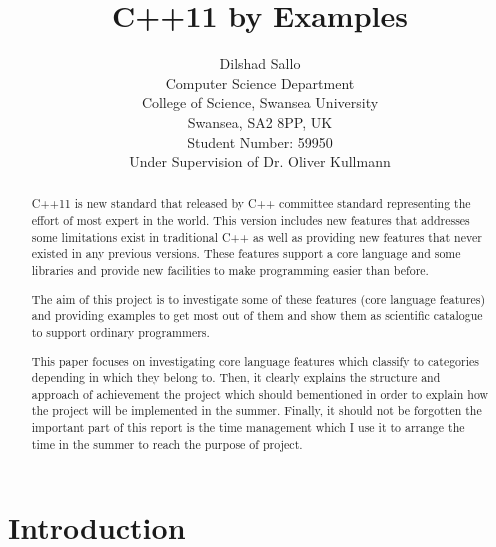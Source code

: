 \documentclass[11pt,]{report}
\begin{document}
\author{Dilshad Sallo\\[1ex]
  Computer Science Department\\
  College of Science, Swansea University\\
  Swansea, SA2 8PP, UK\\[1ex]
  Student Number: 59950\\
  Under Supervision of Dr. Oliver Kullmann
}

\title{C++11 by Examples}

\maketitle



\begin{abstract}

C++11 is new standard that released by C++ committee standard \linebreak representing the effort of most expert in the world. This version includes new features that addresses some limitations exist in traditional C++ as well as \linebreak providing new features that never existed in any previous versions. These \linebreak features support a core language and some libraries and  provide new facilities  to make programming easier than before.

The aim of this project is to investigate some of these features (core \linebreak language features) and providing examples to get most out of them and show them as scientific catalogue to support  ordinary programmers.

This paper focuses on investigating core language features which classify to categories depending in which they belong to. Then, it clearly explains the structure  and  approach of achievement the project which should be\linebreak mentioned in order to explain how the project will be implemented in the \linebreak summer. Finally, it should not be forgotten the important part of this \linebreak report is the time management which  I use it to arrange the time in the summer to reach the purpose of project.
\end{abstract}

\tableofcontents


\chapter{Introduction}
\label{cha:Introduction}
\end{document}
